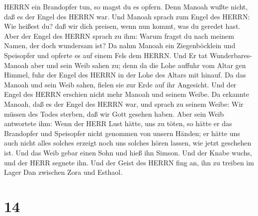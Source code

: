 HERRN ein Brandopfer tun, so magst du es opfern. Denn Manoah wußte
nicht, daß es der Engel des HERRN war.  Und Manoah sprach
zum Engel des HERRN: Wie heißest du? daß wir dich preisen, wenn nun
kommt, was du geredet hast.  Aber der Engel des HERRN
sprach zu ihm: Warum fragst du nach meinem Namen, der doch wundersam
ist?  Da nahm Manoah ein Ziegenböcklein und Speisopfer und
opferte es auf einem Fels dem HERRN. Und Er tat Wunderbares-Manoah aber
und sein Weib sahen zu;  denn da die Lohe auffuhr vom Altar
gen Himmel, fuhr der Engel des HERRN in der Lohe des Altars mit hinauf.
Da das Manoah und sein Weib sahen, fielen sie zur Erde auf ihr
Angesicht.  Und der Engel des HERRN erschien nicht mehr
Manoah und seinem Weibe. Da erkannte Manoah, daß es der Engel des HERRN
war,  und sprach zu seinem Weibe: Wir müssen des Todes
sterben, daß wir Gott gesehen haben.  Aber sein Weib
antwortete ihm: Wenn der HERR Lust hätte, uns zu töten, so hätte er das
Brandopfer und Speisopfer nicht genommen von unsern Händen; er hätte uns
auch nicht alles solches erzeigt noch uns solches hören lassen, wie
jetzt geschehen ist.  Und das Weib gebar einen Sohn und
hieß ihn Simson. Und der Knabe wuchs, und der HERR segnete ihn.
 Und der Geist des HERRN fing an, ihn zu treiben im Lager
Dan zwischen Zora und Esthaol.

\hypertarget{section-13}{%
\section{14}\label{section-13}}

